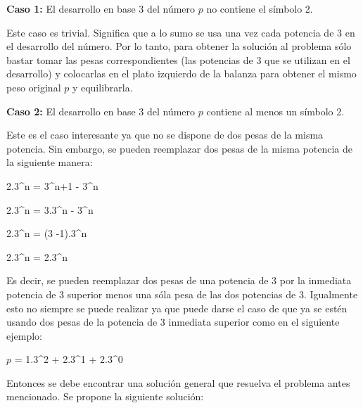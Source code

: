 	\newline

     \textbf{Caso 1:} El desarrollo en base 3 del número $p$ no contiene el símbolo 2.

    Este caso es trivial. Significa que a lo sumo se usa una vez cada potencia de 3 en el desarrollo del número. Por lo tanto, para obtener la solución al problema sólo bastar tomar las pesas correspondientes (las potencias de 3 que se utilizan en el desarrollo) y colocarlas en el plato izquierdo de la balanza para obtener el mismo peso original $p$ y equilibrarla.

	\newline

     \textbf{Caso 2:} El desarrollo en base 3 del número $p$ contiene al menos un símbolo 2.

    Este es el caso interesante ya que no se dispone de dos pesas de la misma potencia. Sin embargo, se pueden reemplazar dos pesas de la misma potencia de la siguiente manera:

    \newline

    \begin{center}

    	2.3^n = 3^{n+1} - 3^{n}

    	\newline

		2.3^n = 3.3^n - 3^n

		\newline

		2.3^n = (3 -1).3^n

		\newline

		2.3^n = 2.3^n

    \end{center}

	Es decir, se pueden reemplazar dos pesas de una potencia de 3 por la inmediata potencia de 3 superior menos una sóla pesa de las dos potencias de 3. Igualmente esto no siempre se puede realizar ya que puede darse el caso de que ya se estén usando dos pesas de la potencia de 3 inmediata superior como en el siguiente ejemplo:  


    \newline
    \begin{center}

    	$p$ = 1.3^2 + 2.3^1 + 2.3^0
    
    \end{center} 

    Entonces se debe encontrar una solución general que resuelva el problema antes mencionado. Se propone la siguiente solución:

